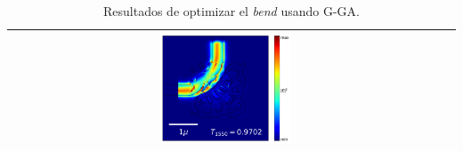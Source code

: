 \begin{table}[ht]
\begin{tabular}{|c|c|c|c|}
      \cline{2-4}
      &
      \includegraphics[width=0.33\textwidth]{image/results/bend/GA/visualize_field_cont_512.png} \\
    \hline
    \end{tabular}
    \hspace*{-3cm}
    \caption{Resultados de optimizar el \emph{bend} usando G-GA.}
    \label{tab:opt-GA-bend}
\end{table}
